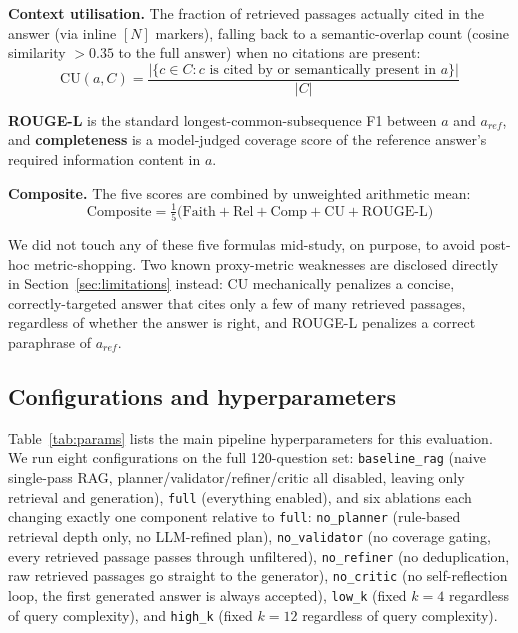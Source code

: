 \documentclass[conference]{IEEEtran}
\begin{document}
\textbf{Context utilisation.} The fraction of retrieved passages actually cited in the
answer (via inline $[N]$ markers), falling back to a semantic-overlap count
(cosine similarity $>0.35$ to the full answer) when no citations are present:
\begin{equation}
\mathrm{CU}(a, C) = \frac{|\{c \in C : c \text{ is cited by or semantically present in } a\}|}{|C|}
\end{equation}

\textbf{ROUGE-L} is the standard longest-common-subsequence F1 between $a$ and
$a_{ref}$, and \textbf{completeness} is a model-judged coverage score of the reference
answer's required information content in $a$.

\textbf{Composite.} The five scores are combined by unweighted arithmetic mean:
\begin{equation}
\mathrm{Composite} = \tfrac{1}{5}\big(\mathrm{Faith} + \mathrm{Rel} + \mathrm{Comp} + \mathrm{CU} + \mathrm{ROUGE\text{-}L}\big)
\end{equation}

We did not touch any of these five formulas mid-study, on purpose, to avoid post-hoc
metric-shopping. Two known proxy-metric weaknesses are disclosed directly in
Section~\ref{sec:limitations} instead: $\mathrm{CU}$ mechanically penalizes a concise,
correctly-targeted answer that cites only a few of many retrieved passages, regardless
of whether the answer is right, and ROUGE-L penalizes a correct paraphrase of
$a_{ref}$.

\subsection{Configurations and hyperparameters}

Table~\ref{tab:params} lists the main pipeline hyperparameters for this evaluation. We
run eight configurations on the full 120-question set: \texttt{baseline\_rag} (naive
single-pass RAG, planner/validator/refiner/critic all disabled, leaving only retrieval
and generation), \texttt{full} (everything enabled), and six ablations each changing
exactly one component relative to \texttt{full}: \texttt{no\_planner} (rule-based
retrieval depth only, no LLM-refined plan), \texttt{no\_validator} (no coverage gating,
every retrieved passage passes through unfiltered), \texttt{no\_refiner} (no
deduplication, raw retrieved passages go straight to the generator), \texttt{no\_critic}
(no self-reflection loop, the first generated answer is always accepted),
\texttt{low\_k} (fixed $k=4$ regardless of query complexity), and \texttt{high\_k}
(fixed $k=12$ regardless of query complexity).
\end{document}
